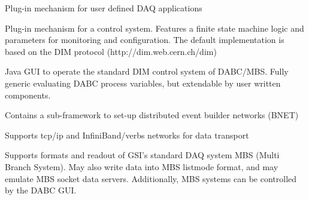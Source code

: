\item Plug-in mechanism for user defined DAQ applications

\item Plug-in mechanism for a control system. Features a finite state machine
   logic and parameters for monitoring and  configuration.
   The default implementation is based
   on the DIM protocol (http://dim.web.cern.ch/dim)

\item Java GUI to operate the standard DIM control system of DABC/MBS. 
   Fully generic evaluating DABC process variables, but extendable
   by user written components.

\item Contains a sub-framework to set-up distributed event builder networks (BNET) 
 
\item Supports tcp/ip and InfiniBand/verbs networks for data transport

\item Supports formats and readout of GSI's standard DAQ system MBS
   (Multi Branch System). May also write data into MBS listmode format,
   and may emulate MBS socket data servers.
   Additionally, MBS systems can be controlled by the DABC GUI.  
\enum

% 
% 
% 

